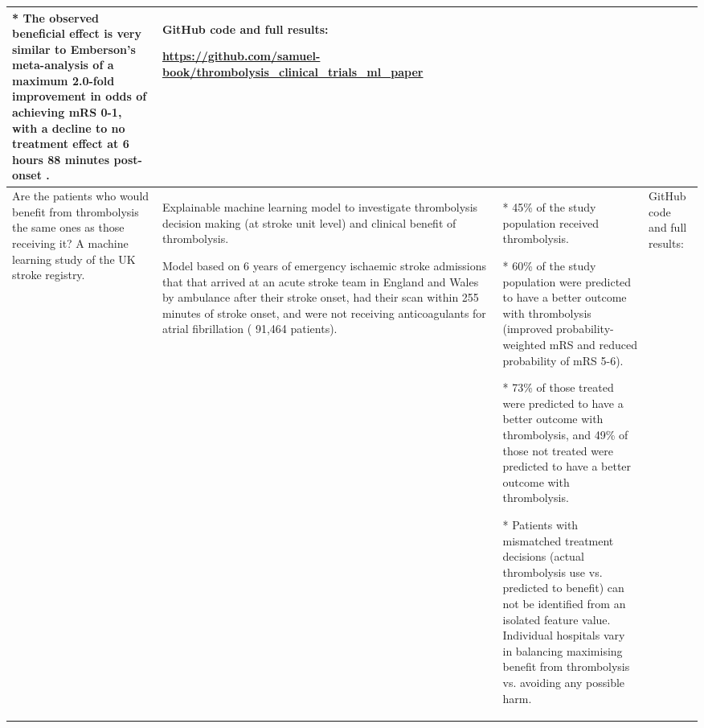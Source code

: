 \begin{landscape}
\begin{longtable}{p{6cm}|p{6cm}|p{8cm}|p{5cm}}
\vspace{2mm}

* The observed beneficial effect is very similar to Emberson’s meta-analysis of a maximum 2.0-fold improvement in odds of achieving mRS 0-1, with a decline to no treatment effect at 6 hours 88 minutes post-onset \cite{emberson_effect_2014}. & 

GitHub code and full results: 

\url{https://github.com/samuel-book/thrombolysis_clinical_trials_ml_paper}
\tabularnewline

\midrule
Are the patients who would benefit from thrombolysis the same ones as those receiving it? A machine learning study of the UK stroke registry.\cite{pearn_are_2024} &

Explainable machine learning model to investigate thrombolysis decision making (at stroke unit level) and clinical benefit of thrombolysis.

\vspace{2mm}

Model based on 6 years of emergency ischaemic stroke admissions that that arrived at an acute stroke team in England and Wales by ambulance after their stroke onset,  had their scan within 255 minutes of stroke onset, and were not receiving anticoagulants for atrial fibrillation ( 91,464 patients).&

* 45\% of the study population received thrombolysis.

\vspace{2mm}

* 60\% of the study population were predicted to have a better outcome with thrombolysis (improved probability-weighted mRS and reduced probability of mRS 5-6).

\vspace{2mm}

* 73\% of those treated were predicted to have a better outcome with thrombolysis, and 49\% of those not treated were predicted to have a better outcome with thrombolysis. 

\vspace{2mm}

* Patients with mismatched treatment decisions (actual thrombolysis use vs. predicted to benefit) can not be identified from an isolated feature value. Individual hospitals vary in balancing maximising benefit from thrombolysis vs. avoiding any possible harm.&

GitHub code and full results:


\end{longtable}
\end{landscape}
